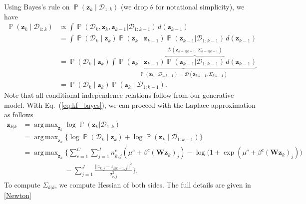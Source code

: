 \documentclass{article}
\DeclareMathOperator{\Pp}{\mathbb{P}}
\DeclareMathOperator*{\argmax}{arg\,max}
\newcommand{\W}{\mathbf{W}}
\newcommand{\data}{\mathcal{D}}
\def\*#1{\mathbf{#1}}
\begin{document}
Using Bayes's rule on $\Pp (\*z_k \mid \data_{1:k})$ (we drop $\theta$ for notational simplicity), we have
\begin{equation}\label{eq:kf_bayes}
    \begin{split}
   \Pp ( \*z_k \mid \data_{1:k}) & \propto\int\Pp(\data_k,\*z_k, \*z_{k-1}|\data_{1:k-1})\,d(\*z_{k-1})\\
   & =
      \int\Pp (\data_k \mid\*z_k) 
      \Pp (\*z_k \mid\*z_{k-1})\Pp(\*z_{k-1}| \data_{1:k-1}) \,d(\*z_{k-1}) \\
  & =
      \Pp (\data_k \mid\*z_k) \underbrace{\int
      \Pp (\*z_k \mid\*z_{k-1})\overbrace{\Pp(\*z_{k-1}| \data_{1:k-1})}^{\data(\*z_{k-1|k-1},\Sigma_{k-1|k-1})} \,d(\*z_{k-1})}_{\Pp (\*z_k \mid \data_{1:k-1})=\data(\*z_{k|k-1},\Sigma_{k|k-1})} \\
   &= \Pp (\data_k \mid \*z_k) \Pp (\*z_k \mid \data_{1:k-1}).
      \end{split}
\end{equation}
Note that all conditional independence relations follow from our generative
model. With Eq.~(\ref{eq:kf_bayes}), we can proceed with the Laplace
approximation as follows
\begin{equation}
    \begin{split}
      \*z_{k|k}&=\argmax_{\*z_k}\log \Pp(\*z_k | \data_{1:k})\\
      &=\argmax_{\*z_k}\{\log\Pp (\data_k \mid \*z_k) +\log\Pp (\*z_k \mid \data_{1:k-1})\}\\
      &= \argmax_{\*z_k} \Big\{ \sum_{c=1}^C \sum_{j=1}^J n_{k,j}^c ( \mu^c + \beta^c (\W \*z_k)_j) 
         - \log \big(1 + \exp ( \mu^c + \beta^c(\W \*z_k )_j ) \big)\\
      &\quad \quad \quad \quad \quad \quad - \sum_{j=1}^J \frac{|| z_{k,j} - 
         z_{k|k-1,j}||^2} {\sigma^2_{\nu,j}}\Big\}.
    \end{split}
\end{equation}
To compute $\Sigma_{k|k}$, we compute Hessian of both sides. The full details are given in \ref{Newton}

\end{document}
